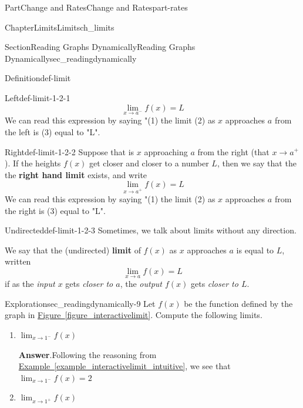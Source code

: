\documentclass[oneside,10pt,]{tufte-book}
\newcommand{\blocktitlefont}{\relax}
\newcommand{\xreffont}{\relax}
\newcommand{\terminology}[1]{\textbf{#1}}
\numberwithin{equation}{chapter}
\begin{document}
\begin{partptx}{Part}{Change and Rates}{}{Change and Rates}{}{}{part-rates}
\begin{chapterptx}{Chapter}{Limits}{}{Limits}{}{}{ch_limits}
\begin{sectionptx}{Section}{Reading Graphs Dynamically}{}{Reading Graphs Dynamically}{}{}{sec_readingdynamically}
\begin{definition}{Definition}{}{def-limit}
\begin{descriptionlist}
\begin{dlimedium}{Left}{def-limit-1-2-1}
\begin{equation*}
\lim_{x\rightarrow a^-} f(x) = L
\end{equation*}
We can read this expression by saying "(1) the limit (2) as \(x\) approaches \(a\) from the left is (3) equal to "L".%
\end{dlimedium}%
\begin{dlimedium}{Right}{def-limit-1-2-2}%
Suppose that is \(x\) approaching \(a\) from the right (that \(x\rightarrow a^+\)). If the heights \(f(x)\) get closer and closer to a number \(L\), then we say that the the \terminology{right hand limit} exists, and write%
\begin{equation*}
\lim_{x\rightarrow a^+} f(x) = L
\end{equation*}
We can read this expression by saying "(1) the limit (2) as \(x\) approaches \(a\) from the right is (3) equal to "L".%
\end{dlimedium}%
\begin{dlimedium}{Undirected}{def-limit-1-2-3}%
Sometimes, we talk about limits without any direction.%
\par
We say that the (undirected) \terminology{limit} of \(f(x)\) as \(x\) approaches \(a\) is equal to \(L\), written%
\begin{equation*}
\lim_{x\rightarrow a} f(x) = L
\end{equation*}
if  as the \emph{input \(x\)} gets \emph{closer to \(a\)}, the \emph{output \(f(x)\)} gets \emph{closer to \(L\)}.%
\end{dlimedium}%
\end{descriptionlist}
\end{definition}
\begin{exploration}{Exploration}{}{sec_readingdynamically-9}%
Let \(f(x)\) be the function defined by the graph in \hyperref[figure_interactivelimit]{Figure~{\xreffont\ref{figure_interactivelimit}}}. Compute the following limits.%
\begin{enumerate}[font=\bfseries,label=(\alph*),ref=\alph*]%
\item{}\(\displaystyle \lim_{x\rightarrow 1^-} f(x)\)%
\par\smallskip%
\noindent\textbf{\blocktitlefont Answer}.\hypertarget{sec_readingdynamically-9-2-2}{}\quad{}Following the reasoning from \hyperref[example_interactivelimit_intuitive]{Example~{\xreffont\ref{example_interactivelimit_intuitive}}}, we see that \(\displaystyle \lim_{x\rightarrow 1^-} f(x)=2\)%
\item{}\(\displaystyle \lim_{x\rightarrow 1^+} f(x)\)%

\end{enumerate}
\end{exploration}
\end{sectionptx}
\end{chapterptx}
\end{partptx}
\end{document}
